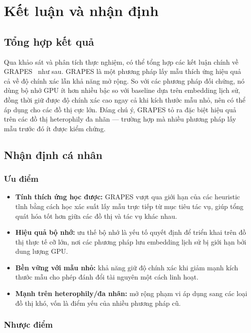 \chapter{Kết luận và nhận định}

\section{Tổng hợp kết quả}

Qua khảo sát và phân tích thực nghiệm, có thể tổng hợp các kết luận chính về GRAPES~\cite{Younesian2023GRAPES} như sau. GRAPES là một phương pháp lấy mẫu thích ứng hiệu quả cả về độ chính xác lẫn khả năng mở rộng. So với các phương pháp đối chứng, nó dùng bộ nhớ GPU ít hơn nhiều bậc so với baseline dựa trên embedding lịch sử, đồng thời giữ được độ chính xác cao ngay cả khi kích thước mẫu nhỏ, nên có thể áp dụng cho các đồ thị cực lớn. Đáng chú ý, GRAPES tỏ ra đặc biệt hiệu quả trên các đồ thị heterophily đa nhãn --- trường hợp mà nhiều phương pháp lấy mẫu trước đó ít được kiểm chứng.

\section{Nhận định cá nhân}

\subsection{Ưu điểm}

\begin{itemize}
    \item \textbf{Tính thích ứng học được:} GRAPES vượt qua giới hạn của các heuristic tĩnh bằng cách học xác suất lấy mẫu trực tiếp từ mục tiêu tác vụ, giúp tổng quát hóa tốt hơn giữa các đồ thị và tác vụ khác nhau.
    \item \textbf{Hiệu quả bộ nhớ:} ưu thế bộ nhớ là yếu tố quyết định để triển khai trên đồ thị thực tế cỡ lớn, nơi các phương pháp lưu embedding lịch sử bị giới hạn bởi dung lượng GPU.
    \item \textbf{Bền vững với mẫu nhỏ:} khả năng giữ độ chính xác khi giảm mạnh kích thước mẫu cho phép đánh đổi tài nguyên một cách linh hoạt.
    \item \textbf{Mạnh trên heterophily/đa nhãn:} mở rộng phạm vi áp dụng sang các loại đồ thị khó, vốn là điểm yếu của nhiều phương pháp cũ.
\end{itemize}

\subsection{Nhược điểm}

